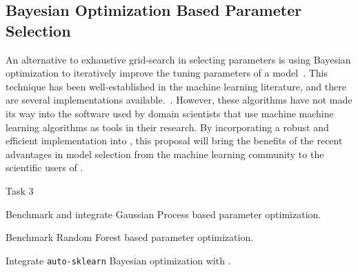 \subsection{Bayesian Optimization Based Parameter Selection}
An alternative to exhaustive grid-search in selecting parameters is using
Bayesian optimization to iteratively improve the tuning parameters of a
model~\autocite{NIPS2011_4443, shahriari2016taking, NIPS2012_4522}.  This
technique has been well-established in the machine learning literature, and
there are several implementations available.~\autocite{bergstra2013hyperopt,
feurer-nips2015, komer2014hyperopt, snoek2015scalable}.  However, these
algorithms have not made its way into the software used by domain scientists
that use machine machine learning algorithms as tools in their research.
By incorporating a robust and efficient implementation into \sklearn{},
this proposal will bring the benefits of the recent advantages in model selection
from the machine learning community to the scientific users of \sklearn{}.
\begin{labeling}{Task 3}
    \item [Task 3] Benchmark and integrate Gaussian Process based parameter optimization.
    \item [Task 4] Benchmark Random Forest based parameter optimization.
    \item [Task 5] Integrate \texttt{auto-sklearn} Bayesian optimization with \sklearn{}.
\end{labeling}


